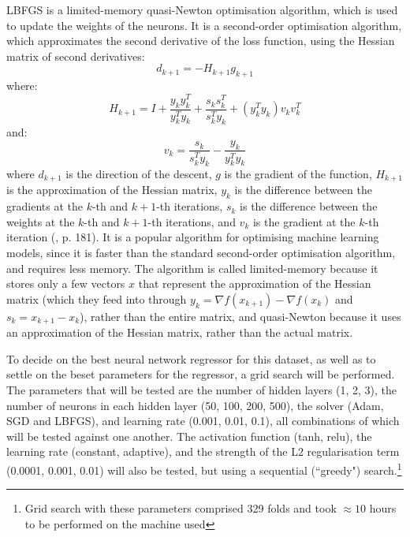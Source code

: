 \documentclass[12pt]{report}
\begin{document}
LBFGS is a limited-memory quasi-Newton optimisation algorithm, which is used to update the weights of the neurons. It is a second-order optimisation algorithm, which approximates the second derivative of the loss function, using the Hessian matrix of second derivatives:
\begin{equation}
	d_{k+1} = -H_{k+1}g_{k+1}
\end{equation}
where:
\begin{equation}
	H_{k+1} = I + \frac{y_k y_k^T}{y_k^Ty_k} + \frac{s_k s_k^T}{s_k^Ty_k}+(y_k^Ty_k)v_k v_k^T
\end{equation}
and:
\begin{equation}
	v_k = \frac{s_k}{s_k^Ty_k}-\frac{y_k}{y_k^Ty_k}
\end{equation}
where $d_{k+1}$ is the direction of the descent, $g$ is the gradient of the function, $H_{k+1}$ is the approximation of the Hessian matrix, $y_k$ is the difference between the gradients at the $k$-th and $k+1$-th iterations, $s_k$ is the difference between the weights at the $k$-th and $k+1$-th iterations, and $v_k$ is the gradient at the $k$-th iteration (\cite{pytlak2009}, p. 181).
It is a popular algorithm for optimising machine learning models, since it is faster than the standard second-order optimisation algorithm, and requires less memory. The algorithm is called limited-memory because it stores only a few vectors $x$ that represent the approximation of the Hessian matrix (which they feed into through $y_k = \nabla f(x_{k+1})-\nabla f(x_k)$ and $s_k = x_{k+1}-x_k$), rather than the entire matrix, and quasi-Newton because it uses an approximation of the Hessian matrix, rather than the actual matrix.

To decide on the best neural network regressor for this dataset, as well as to settle on the beset parameters for the regressor, a grid search will be performed. The parameters that will be tested are the number of hidden layers (1, 2, 3), the number of neurons in each hidden layer (50, 100, 200, 500), the solver (Adam, SGD and LBFGS), and learning rate (0.001, 0.01, 0.1), all combinations of which will be tested against one another. The activation function (tanh, relu), the learning rate (constant, adaptive), and the strength of the L2 regularisation term (0.0001, 0.001, 0.01) will also be tested, but using a sequential (``greedy") search.\footnote{Grid search with these parameters comprised 329 folds and took $\approx10$ hours to be performed on the machine used}
\end{document}
